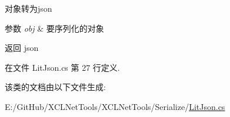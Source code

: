 对象转为json 


\begin{DoxyParams}{参数}
{\em obj} & 要序列化的对象\\
\hline
\end{DoxyParams}
\begin{DoxyReturn}{返回}
json
\end{DoxyReturn}


在文件 Lit\+Json.\+cs 第 27 行定义.



该类的文档由以下文件生成\+:\begin{DoxyCompactItemize}
\item 
E\+:/\+Git\+Hub/\+X\+C\+L\+Net\+Tools/\+X\+C\+L\+Net\+Tools/\+Serialize/\hyperlink{_lit_json_8cs}{Lit\+Json.\+cs}\end{DoxyCompactItemize}
